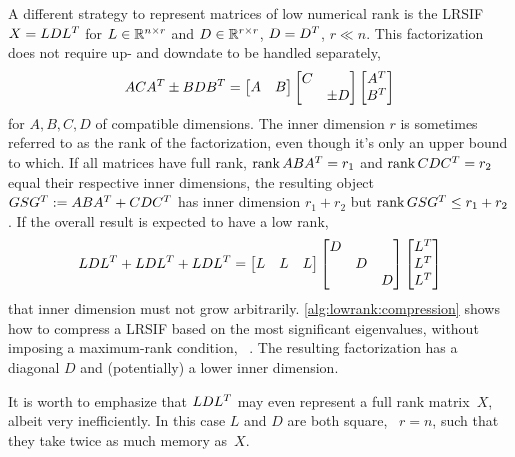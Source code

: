 A different strategy to represent matrices of low numerical rank is the \ac{LRSIF} \cite{Benner2009,Lang2015}
$X = LDL^T$ for $L\in\mathbb{R}^{n\times r}$ and $D\in\mathbb{R}^{r \times r}$, $D=D^T$, $r\ll n$.
This factorization does not require up- and downdate to be handled separately,
\begin{equation}
  ACA^T \pm BDB^T =
  \begin{bmatrix}
    A & B
  \end{bmatrix}
  \begin{bmatrix}
    C \\ & \pm D
  \end{bmatrix}
  \begin{bmatrix}
    A^T \\ B^T
  \end{bmatrix}
\end{equation}
for $A, B, C, D$ of compatible dimensions.
The inner dimension $r$ is sometimes referred to as the rank of the factorization,
even though it's only an upper bound to which.
If all matrices have full rank,
\ie $\operatorname{rank} ABA^T = r_1$ and $\operatorname{rank} CDC^T = r_2$ equal their respective inner dimensions,
the resulting object $GSG^T := ABA^T + CDC^T$ has inner dimension $r_1 + r_2$
but $\operatorname{rank} GSG^T \leq r_1 + r_2$.
If the overall result is expected to have a low rank,
\eg
\begin{equation}
  LDL^T + LDL^T + LDL^T
  = \begin{bmatrix}
    L & L & L
  \end{bmatrix}
  \begin{bmatrix}
    D \\
    & D \\
    && D
  \end{bmatrix}
  \begin{bmatrix}
    L^T \\
    L^T \\
    L^T
  \end{bmatrix}
\end{equation}
that inner dimension must not grow arbitrarily.
\autoref{alg:lowrank:compression} shows how to compress a \ac{LRSIF}
based on the most significant eigenvalues,
without imposing a maximum-rank condition,
\cf~\cite[Section~6.3.3]{Lang2017}.
The resulting factorization has a diagonal $D$ and (potentially) a lower inner dimension.

\begin{remark}
  It is worth to emphasize that $LDL^T$ may even represent a full rank matrix~$X$,
  albeit very inefficiently.
  In this case $L$ and $D$ are both square, \ie~$r=n$,
  such that they take twice as much memory as~$X$.
\end{remark}

